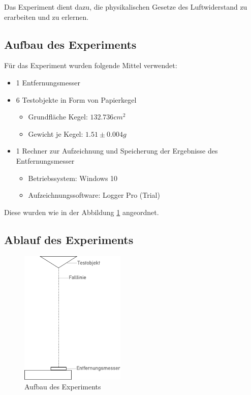 Das Experiment dient dazu, die physikalischen Gesetze des Luftwiderstand zu erarbeiten und zu erlernen. 

\subsection{Aufbau des Experiments}

Für das Experiment wurden folgende Mittel verwendet:

\begin{itemize}
	\item 1 Entfernungsmesser
	\item 6 Testobjekte in Form von Papierkegel
	\begin{itemize}
		\item Grundfläche Kegel: \(132.736 cm^2\)
		\item Gewicht je Kegel: \(1.51 \pm 0.004g \)
	\end{itemize}
	\item 1 Rechner zur Aufzeichnung und Speicherung der Ergebnisse des Entfernungsmesser
	\begin{itemize}
		\item Betriebssystem: Windows 10 
		\item Aufzeichnungssoftware: Logger Pro (Trial)
	\end{itemize}
\end{itemize}

Diese wurden wie in der Abbildung \ref{fig:expsetup} angeordnet.

\subsection{Ablauf des Experiments}



\begin{figure}
	\center
	\includegraphics[width=5cm]{diagrams/experiment_aufbau}\caption{\label{fig:expsetup} Aufbau des Experiments}	
\end{figure}

